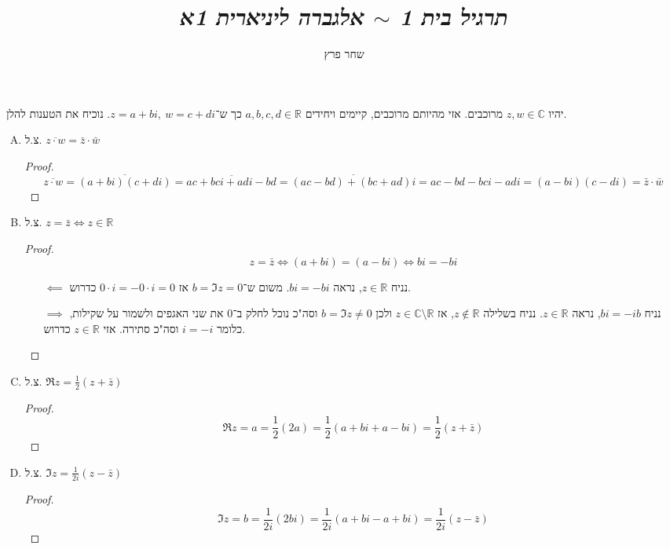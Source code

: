 \documentclass[]{article}
\author{שחר פרץ}
\title{\textit{תרגיל בית 1 $\sim$ אלגברה ליניארית 1א}}
\newcommand\R     {\mathbb{R}}
\newcommand\C     {\mathbb{C}}
\newcommand\ol    {\overline}
\theoremstyle{definition}
\begin{document}
	\maketitle
	\section{}
	יהיו $z, w \in \C$ מרוכבים. אזי מהיותם מרוכבים, קיימים ויחידים $a, b, c, d \in \R$ כך ש־$z = a + bi, \ w = c + di$. 
	נוכיח את הטענות להלן. 
	\begin{enumerate}[(A)]
		\item צ.ל. $\ol{z \cdot w} = \bar z \cdot \bar w$ \begin{proof}
			\[ \ol{z \cdot w} = \ol{(a + bi)(c + di)} = \ol{ac + bci + adi - bd} = \ol{(ac - bd) + (bc + ad)i} = ac - bd - bci - adi = (a - bi)(c - di) = \bar z \cdot \bar w \]
		\end{proof}
		\item צ.ל. $z = \bar z \iff z \in \R$ \begin{proof}
			\[ z = \bar z \iff (a + bi) = (a - bi) \iff bi = -bi \]
			\begin{itemize}
				\item[$\impliedby$]נניח $z \in \R$, נראה $bi = -bi$. משום ש־$b = \Im z = 0$ אז $0 \cdot i = - 0 \cdot i = 0$ כדרוש. 
				\item[$\implies$]נניח $bi = -ib$, נראה $z \in \R$. נניח בשלילה $z \notin \R$, אז $z \in \C \setminus \R$ ולכן $b = \Im z \neq 0$ וסה"כ נוכל לחלק ב־$0$ את שני האגפים ולשמור על שקילות, כלומר $i = -i$ וסה"כ סתירה. אזי $z \in \R$ כדרוש. 
			\end{itemize}
		\end{proof}
		\item צ.ל. $\Re z = \frac{1}{2}(z + \bar z)$ \begin{proof}
			\[ \Re z = a = \frac{1}{2}(2a) = \frac{1}{2}(a + bi + a - bi) = \frac{1}{2}(z + \bar z) \]
		\end{proof}
		\item צ.ל. $\Im z = \frac{1}{2i}(z - \bar z)$ \begin{proof}
			\[ \Im z = b = \frac{1}{2i}(2bi) = \frac{1}{2i}(a + bi - a + bi) = \frac{1}{2i}(z - \bar z) \]
		\end{proof}
	\end{enumerate}
	
\end{document}
